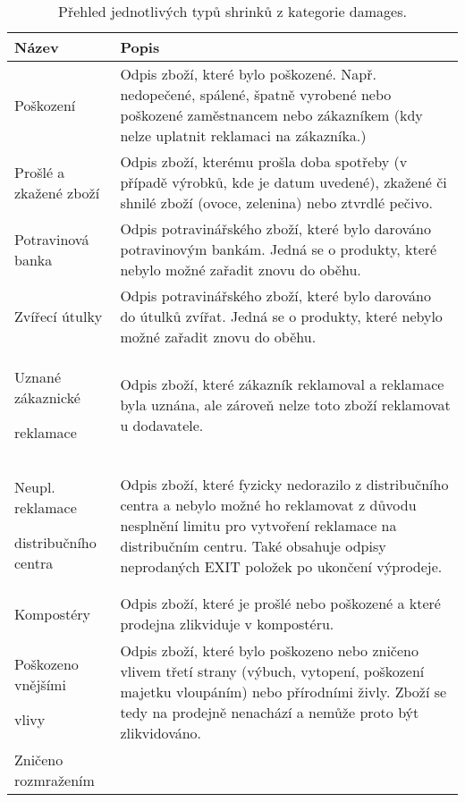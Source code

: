 \begin{table}[hbtp!]
    \caption{Přehled jednotlivých typů shrinků z kategorie damages.}
    \label{tab:sh:dam}
    \begin{tabular}{ p{4cm} p{10.5cm}}
         Název             & Popis \\
    \hline
                Poškození               & Odpis zboží, které bylo poškozené. Např. nedopečené, spálené, špatně vyrobené nebo poškozené zaměstnancem nebo zákazníkem (kdy nelze uplatnit reklamaci na zákazníka.)       \\
                Prošlé a zkažené zboží  & Odpis zboží, kterému prošla doba spotřeby (v případě výrobků, kde je datum uvedené), zkažené či shnilé zboží (ovoce, zelenina) nebo ztvrdlé pečivo.       \\
                Potravinová banka       & Odpis potravinářského zboží, které bylo darováno potravinovým bankám. Jedná se o produkty, které nebylo možné zařadit znovu do oběhu.    \\
                Zvířecí útulky          & Odpis potravinářského zboží, které bylo darováno do útulků zvířat. Jedná se o produkty, které nebylo možné zařadit znovu do oběhu.          \\
                Uznané zákaznické \par reklamace \strut  & Odpis zboží, které zákazník reklamoval a reklamace byla uznána, ale zároveň nelze toto zboží reklamovat u dodavatele.      \\
                Neupl. reklamace \par distribučního centra \strut   &  Odpis zboží, které fyzicky nedorazilo z distribučního centra a nebylo možné ho reklamovat z důvodu nesplnění limitu pro vytvoření reklamace na distribučním centru. Také obsahuje odpisy neprodaných EXIT položek po ukončení výprodeje.     \\
                Kompostéry              & Odpis zboží, které je prošlé nebo poškozené a které prodejna zlikviduje v kompostéru.       \\
                Poškozeno vnějšími \par vlivy \strut %
                                        & Odpis zboží, které bylo poškozeno nebo zničeno vlivem třetí strany (výbuch, vytopení, poškození majetku vloupáním) nebo přírodními živly. Zboží se tedy na prodejně nenachází a nemůže proto být zlikvidováno.      \\
                Zničeno  rozmražením    &       \\
    \end{tabular}
\end{table}

